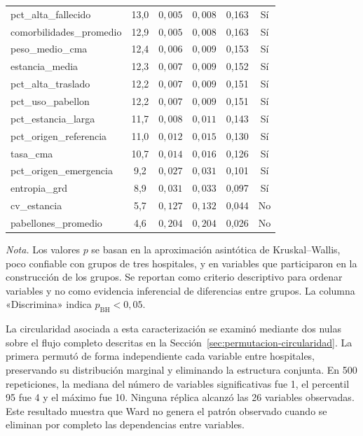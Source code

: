 \begin{table}[htbp]
\begin{tabular}{l c c c c c}
pct\_alta\_fallecido
& 13,0 & $0{,}005$ & $0{,}008$ & 0,163 & Sí \\
comorbilidades\_promedio
& 12,9 & $0{,}005$ & $0{,}008$ & 0,163 & Sí \\
peso\_medio\_cma
& 12,4 & $0{,}006$ & $0{,}009$ & 0,153 & Sí \\
estancia\_media
& 12,3 & $0{,}007$ & $0{,}009$ & 0,152 & Sí \\
pct\_alta\_traslado
& 12,2 & $0{,}007$ & $0{,}009$ & 0,151 & Sí \\
pct\_uso\_pabellon
& 12,2 & $0{,}007$ & $0{,}009$ & 0,151 & Sí \\
pct\_estancia\_larga
& 11,7 & $0{,}008$ & $0{,}011$ & 0,143 & Sí \\
pct\_origen\_referencia
& 11,0 & $0{,}012$ & $0{,}015$ & 0,130 & Sí \\
tasa\_cma
& 10,7 & $0{,}014$ & $0{,}016$ & 0,126 & Sí \\
pct\_origen\_emergencia
& 9,2 & $0{,}027$ & $0{,}031$ & 0,101 & Sí \\
entropia\_grd
& 8,9 & $0{,}031$ & $0{,}033$ & 0,097 & Sí \\
cv\_estancia
& 5,7 & $0{,}127$ & $0{,}132$ & 0,044 & No \\
pabellones\_promedio
& 4,6 & $0{,}204$ & $0{,}204$ & 0,026 & No \\
\bottomrule
\end{tabular}
\par\smallskip
\begin{minipage}{\textwidth}
\normalsize\raggedright
\textit{Nota.} Los valores $p$ se basan en la aproximación asintótica de
Kruskal--Wallis, poco confiable con grupos de tres hospitales, y en variables
que participaron en la construcción de los grupos. Se reportan como criterio
descriptivo para ordenar variables y no como evidencia inferencial de
diferencias entre grupos. La columna «Discrimina» indica $p_{\text{BH}}<0{,}05$.
\end{minipage}
\end{table}

La circularidad asociada a esta caracterización se examinó mediante dos
nulas sobre el flujo completo descritas en la
Sección~\ref{sec:permutacion-circularidad}. La primera permutó de forma
independiente cada variable entre hospitales, preservando su distribución
marginal y eliminando la estructura conjunta. En 500 repeticiones, la mediana
del número de variables significativas fue 1, el percentil 95 fue 4 y el máximo
fue 10. Ninguna réplica alcanzó las 26 variables observadas. Este resultado
muestra que Ward no genera el patrón observado cuando se eliminan por completo
las dependencias entre variables.

